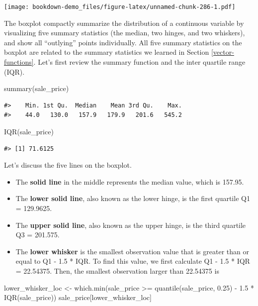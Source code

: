 \documentclass[
]{book}
\newenvironment{Shaded}{\begin{snugshade}}{\end{snugshade}}
\newcommand{\FloatTok}[1]{\textcolor[rgb]{0.00,0.00,0.81}{#1}}
\newcommand{\FunctionTok}[1]{\textcolor[rgb]{0.00,0.00,0.00}{#1}}
\newcommand{\NormalTok}[1]{#1}
\newcommand{\OtherTok}[1]{\textcolor[rgb]{0.56,0.35,0.01}{#1}}
\newcommand{\SpecialCharTok}[1]{\textcolor[rgb]{0.00,0.00,0.00}{#1}}
\providecommand{\tightlist}{%
  \setlength{\itemsep}{0pt}\setlength{\parskip}{0pt}}
\begin{document}
\texttt{[image: bookdown-demo\_files/figure-latex/unnamed-chunk-286-1.pdf]}

The boxplot compactly summarize the distribution of a continuous variable by visualizing five summary statistics (the median, two hinges, and two whiskers), and show all ``outlying'' points individually. All five summary statistics on the boxplot are related to the summary statistics we learned in Section \ref{vector-functions}. Let's first review the summary function and the inter quartile range (IQR).

\begin{Shaded}
\begin{Highlighting}[]
\FunctionTok{summary}\NormalTok{(sale\_price)}
\end{Highlighting}
\end{Shaded}

\begin{verbatim}
#>    Min. 1st Qu.  Median    Mean 3rd Qu.    Max. 
#>    44.0   130.0   157.9   179.9   201.6   545.2
\end{verbatim}

\begin{Shaded}
\begin{Highlighting}[]
\FunctionTok{IQR}\NormalTok{(sale\_price)}
\end{Highlighting}
\end{Shaded}

\begin{verbatim}
#> [1] 71.6125
\end{verbatim}

Let's discuss the five lines on the boxplot.

\begin{itemize}
\tightlist
\item
  The \textbf{solid line} in the middle represents the median value, which is 157.95.
\item
  The \textbf{lower solid line}, also known as the lower hinge, is the first quartile Q1 = 129.9625.
\item
  The \textbf{upper solid line}, also known as the upper hinge, is the third quartile Q3 = 201.575.
\item
  The \textbf{lower whisker} is the smallest observation value that is greater than or equal to Q1 - 1.5 * IQR. To find this value, we first calculate Q1 - 1.5 * IQR = 22.54375.
  Then, the smallest observation larger than 22.54375 is
\end{itemize}

\begin{Shaded}
\begin{Highlighting}[]
\NormalTok{lower\_whisker\_loc }\OtherTok{\textless{}{-}} \FunctionTok{which.min}\NormalTok{(sale\_price }\SpecialCharTok{\textgreater{}=} \FunctionTok{quantile}\NormalTok{(sale\_price, }\FloatTok{0.25}\NormalTok{) }\SpecialCharTok{{-}} \FloatTok{1.5} \SpecialCharTok{*} \FunctionTok{IQR}\NormalTok{(sale\_price))}
\NormalTok{sale\_price[lower\_whisker\_loc]}
\end{Highlighting}
\end{Shaded}
\end{document}
